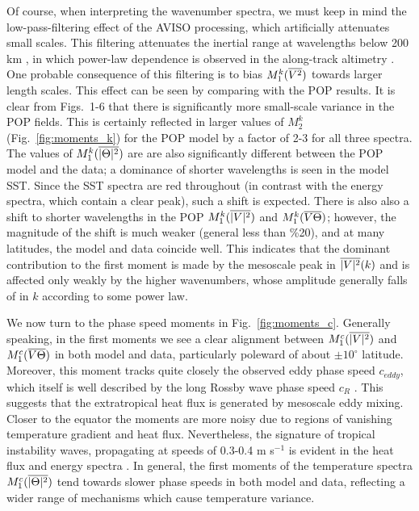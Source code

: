 \documentclass[10pt]{article}
\newcommand{\ol}{\ensuremath{\overline}}
\begin{document}
Of course, when interpreting the wavenumber spectra, we must keep in mind the low-pass-filtering effect of the AVISO processing, which artificially attenuates small scales. This filtering attenuates the inertial range at wavelengths below 200 km \citep{DucetEtAl2000}, in which power-law dependence is observed in the along-track altimetry \citep{XuFu2011}. One probable consequence of this filtering is to bias $M_1^k(\ol{V^2})$ towards larger length scales. This effect can be seen by comparing with the POP results. It is clear from Figs.~1-6 that there is significantly more small-scale variance in the POP fields. This is certainly reflected in larger values of $M_2^k$ (Fig.~\ref{fig:moments_k}) for the POP model by a factor of 2-3 for all three spectra. The values of $M_1^k(\ol{|\Theta|^2})$ are are also significantly different between the POP model and the data; a dominance of shorter wavelengths is seen in the model SST. Since the SST spectra are red throughout (in contrast with the energy spectra, which contain a clear peak), such a shift is expected. There is also also a shift to shorter wavelengths in the POP $M_1^k(\ol{|V|^2})$ and $M_1^k(\ol{V\Theta})$; however, the magnitude of the shift is much weaker (general less than \%20), and at many latitudes, the model and data coincide well. This indicates that the dominant contribution to the first moment is made by the mesoscale peak in $\ol{|V|^2}(k)$ and is affected only weakly by the higher wavenumbers, whose amplitude generally falls of in $k$ according to some power law.

We now turn to the phase speed moments in Fig.~\ref{fig:moments_c}. Generally speaking, in the first moments we see a clear alignment between $M_1^c(\ol{|V|^2})$ and $M_1^c(\ol{V\Theta})$ in both model and data, particularly poleward of about $\pm 10^\circ$ latitude. Moreover, this moment tracks quite closely the observed eddy phase speed $c_{eddy}$, which itself is well described by the long Rossby wave phase speed $c_R$ \citep{TullochEtAl2009,KlockerAbernathey2014}. This suggests that the extratropical heat flux is generated by mesoscale eddy mixing. Closer to the equator the moments are more noisy due to regions of vanishing temperature gradient and heat flux. Nevertheless, the signature of tropical instability waves, propagating at speeds of 0.3-0.4 m s$^{-1}$ is evident in the heat flux and energy spectra \citep[see also][]{Contreras2002,PolitoEtAl2001}. In general, the first moments of the temperature spectra $M_1^c(\ol{|\Theta|^2})$ tend towards slower phase speeds in both model and data, reflecting a wider range of mechanisms which cause temperature variance.
\end{document}
